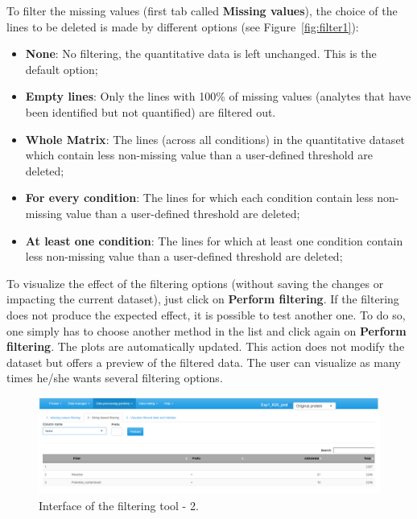 \documentclass[12pt]{article}
\begin{document}
To filter the missing values (first tab called \textbf{Missing values}), the choice 
of the lines to be deleted is made by different options (see 
Figure~\ref{fig:filter1}):
\begin {itemize}
\item\textbf{None}: No filtering, the quantitative data is left unchanged. 
This is the default option;
\item\textbf{Empty lines}: Only the lines with 100\% of missing values 
(analytes that have been identified but not quantified) are filtered out.
\item\textbf{Whole Matrix}: The lines (across all conditions) in the 
quantitative dataset which contain less non-missing value than a 
user-defined threshold are deleted;
\item\textbf{For every condition}: The lines for which each condition 
contain less non-missing value than a user-defined threshold are deleted;
\item\textbf{At least one condition}: The lines for which at least one 
condition contain less non-missing value than a user-defined threshold 
are deleted;
\end {itemize}

To visualize the effect of the filtering options (without saving the changes or
impacting the current dataset), just click on \textbf{Perform filtering}. 
If the filtering does not 
produce the expected effect, it is possible to test another one. To do so, one 
simply has to choose another method in the list and click again on \textbf{Perform 
filtering}. The plots are automatically updated. This action does not modify 
the dataset but offers a preview of the filtered data. The user can visualize 
as many times he/she wants several filtering options.

\begin {figure}
\includegraphics[width=\textwidth]{images/filter2.png}
\caption{Interface of the filtering tool - 2.}\label{fig:filter2}
\end {figure}
\end{document}
